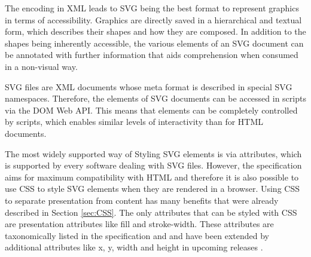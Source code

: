 The encoding in XML leads to SVG being the best format to represent graphics in terms of accessibility. Graphics are directly saved in a hierarchical and textual form, which describes their shapes and how they are composed. In addition to the shapes being inherently accessible, the various elements of an SVG document can be annotated with further information that aids comprehension when consumed in a non-visual way.

SVG files are XML documents whose meta format is described in special SVG namespaces. Therefore, the elements of SVG documents can be accessed in scripts via the DOM Web API.  This means that elements can be completely controlled by scripts, which enables similar levels of interactivity than for HTML documents.

The most widely supported way of Styling SVG elements is via attributes, which is supported by every software dealing with SVG files. However, the specification aims for maximum compatibility with HTML and therefore it is also possible to use CSS to style SVG elements when they are rendered in a browser. Using CSS to separate presentation from content has many benefits that were already described in Section \ref{sec:CSS}. The only attributes that can be styled with CSS are presentation attributes like fill and stroke-width. These attributes are taxonomically listed in the specification \parencite{CSS1.1} and and have been extended by additional attributes like x, y, width and height in upcoming releases \parencite{CSS2}.





